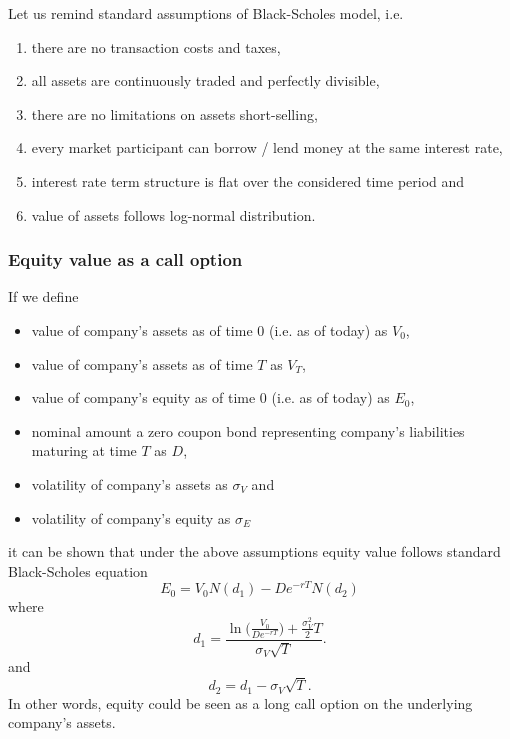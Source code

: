 \documentclass[a4paper]{book}
\begin{document}
Let us remind standard assumptions of Black-Scholes model, i.e.
\begin{enumerate}
\item there are no transaction costs and taxes,
\item all assets are continuously traded and perfectly divisible,
\item there are no limitations on assets short-selling,
\item every market participant can borrow / lend money at the same interest rate,
\item interest rate term structure is flat over the considered time period and
\item value of assets follows log-normal distribution.
\end{enumerate}

\subsubsection{Equity value as a call option}

If we define
\begin{itemize}
\item value of company's assets as of time 0 (i.e. as of today) as $V_0$,
\item value of company's assets as of time $T$ as $V_T$,
\item value of company's equity as of time 0 (i.e. as of today) as $E_0$,
\item nominal amount a zero coupon bond representing company's liabilities maturing at time $T$ as $D$,
\item volatility of company's assets as $\sigma_V$ and
\item volatility of company's equity as $\sigma_E$
\end{itemize}
it can be shown that under the above assumptions equity value follows standard Black-Scholes equation
\begin{equation}
E_0 = V_0 N(d_1) - De^{-rT} N(d_2)
\end{equation}
where
\begin{equation}
d_1 = \frac{\ln \Big(\frac{V_0}{De^{-rT}} \Big) + \frac{\sigma_V^2}{2}T}{\sigma_V \sqrt{T}}.
\end{equation}
and
\begin{equation}
d_2 = d_1 - \sigma_V \sqrt{T}.
\end{equation}
In other words, equity could be seen as a long call option on the underlying company's assets.
\end{document}
